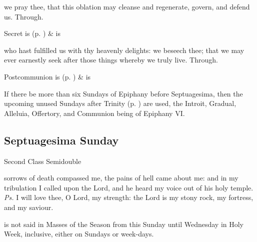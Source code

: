
\secret
{} we pray thee, that this oblation may cleanse and regenerate, govern, and defend us. Through.


\begin{rubric}
     Secret is  (p. \pageref{SPSaints}) \&  is 
\end{rubric}


\postcommunion
{} who hast fulfilled us with thy heavenly delights: we beseech thee; that we may ever earnestly seek after those things whereby we truly live. Through.
\begin{rubric}
     Postcommunion is  (p. \pageref{SPSaints}) \&  is 
\end{rubric}
\begin{rubric}
    If there be more than six Sundays of Epiphany before Septuagesima, then the upcoming unused Sundays after Trinity (p. \pageref{trinity}) are used, the Introit, Gradual, Alleluia, Offertory, and Communion being of Epiphany VI.
\end{rubric}


\subsection{Septuagesima Sunday}
\begin{inhead}
{Second Class Semidouble}
\end{inhead}


\introit
{} sorrows of death compassed me, the pains of hell came about me: and in my tribulation I called upon the Lord, and he heard my voice out of his holy temple. \textit{Ps.} I will love thee, O Lord, my strength: the Lord is my stony rock, my fortress, and my saviour.

\begin{rubric}
     is not said in Masses of the Season from this Sunday until Wednesday in Holy Week, inclusive, either on Sundays or week-days.
\end{rubric}

